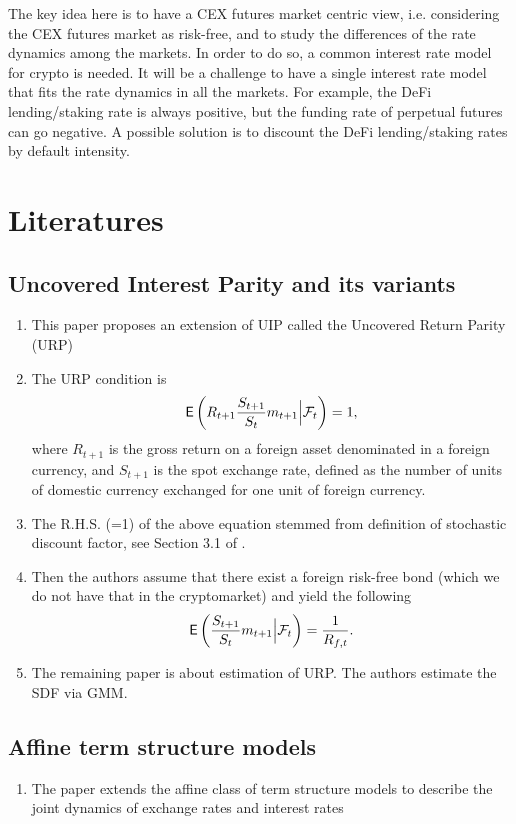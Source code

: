 \documentclass[square]{article} %
\theoremstyle{plain}
\theoremstyle{definition} %
\begin{document}
The key idea here is to have a CEX futures market centric view, i.e. considering the CEX futures market as risk-free,
 and to study the differences of the rate dynamics among the markets. 
 In order to do so, a common interest rate model for crypto is needed. 
 It will be a challenge to have a single interest rate model that fits the rate dynamics in all the markets.
 For example, the DeFi lending/staking rate is always positive, but the funding rate of perpetual futures can go negative.  
 A possible solution is to discount the DeFi lending/staking rates by default intensity.


\section{Literatures}
\subsection{Uncovered Interest Parity and its variants}
\cite{cappiello2007uncovered}
\begin{enumerate}
  \item This paper proposes an extension of UIP called the Uncovered Return Parity (URP)
  \item The URP condition is 
  \begin{align*}
    \mathbb{\sf E}\left(R_{t+1}\frac{S_{t+1}}{S_t}m_{t+1}\Big|\mathcal{F}_t\right)=1,
  \end{align*}
  where $R_{t+1}$ is the gross return on a foreign asset denominated in a foreign currency, and $S_{t+1}$ is the spot exchange rate, defined as the number of units of domestic currency exchanged for one unit of foreign currency. 
  \item The R.H.S. (=1) of the above equation stemmed from definition of stochastic discount factor, see Section 3.1 of \cite{back2010asset}. 
  \item Then the authors assume that there exist a foreign risk-free bond (which we do not have that in the cryptomarket) and yield the following
  \begin{align*}
    \mathbb{\sf E}\left(\frac{S_{t+1}}{S_t}m_{t+1}\Big|\mathcal{F}_t\right) = \frac{1}{R_{f,t}}.
  \end{align*}
  \item The remaining paper is about estimation of URP. The authors estimate the SDF via GMM. 
\end{enumerate}

\subsection{Affine term structure models}
\cite{anderson2010affine}
\begin{enumerate}
  \item The paper extends the affine class of term structure models to describe the joint dynamics of exchange rates and interest rates
\end{enumerate}
\end{document}
